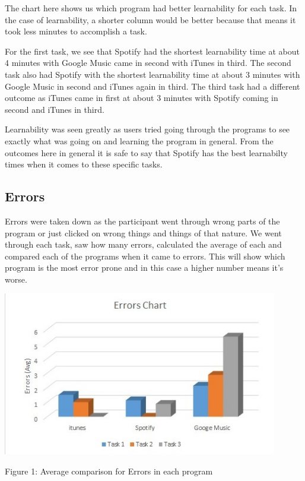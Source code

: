 \documentclass{article}
\begin{document}
{The chart here shows us which program had better learnability for each task. In the case of learnability, a shorter column would be better because that means it took less minutes to accomplish a task. 

For the first task, we see that Spotify had the shortest learnability time at about 4 minutes with Google Music came in second with iTunes in third. The second task also had Spotify with the shortest learnability time at about 3 minutes with Google Music in second and iTunes again in third. The third task had a different outcome as iTunes came in first at about 3 minutes with Spotify coming in second and iTunes in third.

Learnability was seen greatly as users tried going through the programs to see exactly what was going on and learning the program in general. From the outcomes here in general it is safe to say that Spotify has the best learnabilty times when it comes to these specific tasks.

\subsection{Errors}
Errors were taken down as the participant went through wrong parts of the program or just clicked on wrong things and things of that nature. We went through each task, saw how many errors, calculated the average of each and compared each of the programs when it came to errors. This will show which program is the most error prone and in this case a higher number means it's worse.

\begin{center}
\includegraphics[width=120mm]{Errors.jpg}
\end{center}
\begin{center}
Figure 1: Average comparison for Errors in each program
\end{center}

}
\end{document}
